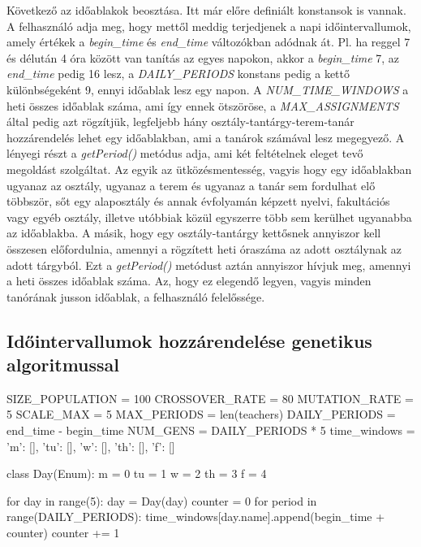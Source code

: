 \documentclass[12pt,a4paper]{report}
\begin{document}
Következő az időablakok beosztása. Itt már előre definiált konstansok is vannak. A felhasználó adja meg, hogy mettől meddig terjedjenek a napi időintervallumok, amely értékek a \textit{begin\_time} és \textit{end\_time} változókban adódnak át. Pl. ha reggel 7 és délután 4 óra között van tanítás az egyes napokon, akkor a \textit{begin\_time} 7, az \textit{end\_time} pedig 16 lesz, a \textit{DAILY\_PERIODS} konstans pedig a kettő különbségeként 9, ennyi időablak lesz egy napon. A \textit{NUM\_TIME\_WINDOWS} a heti összes időablak száma, ami így ennek ötszöröse, a \textit{MAX\_ASSIGNMENTS} által pedig azt rögzítjük, legfeljebb hány osztály-tantárgy-terem-tanár hozzárendelés lehet egy időablakban, ami a tanárok számával lesz megegyező. A lényegi részt a \textit{getPeriod()} metódus adja, ami két feltételnek eleget tevő megoldást szolgáltat. Az egyik az ütközésmentesség, vagyis hogy egy időablakban ugyanaz az osztály, ugyanaz a terem és ugyanaz a tanár sem fordulhat elő többször, sőt egy alaposztály és annak évfolyamán képzett nyelvi, fakultációs vagy egyéb osztály, illetve utóbbiak közül egyszerre több sem kerülhet ugyanabba az időablakba. A másik, hogy egy osztály-tantárgy kettősnek annyiszor kell összesen előfordulnia, amennyi a rögzített heti óraszáma az adott osztálynak az adott tárgyból. Ezt a \textit{getPeriod()} metódust aztán annyiszor hívjuk meg, amennyi a heti összes időablak száma. Az, hogy ez elegendő legyen, vagyis minden tanórának jusson időablak, a felhasználó felelőssége.

\subsection{Időintervallumok hozzárendelése genetikus algoritmussal}

\begin{python}
SIZE_POPULATION = 100
CROSSOVER_RATE = 80
MUTATION_RATE = 5
SCALE_MAX = 5
MAX_PERIODS = len(teachers)
DAILY_PERIODS = end_time - begin_time
NUM_GENS = DAILY_PERIODS * 5
time_windows = {'m': [], 'tu': [], 'w': [], 'th': [], 'f': []}


class Day(Enum):
    m = 0
    tu = 1
    w = 2
    th = 3
    f = 4


for day in range(5):
    day = Day(day)
    counter = 0
    for period in range(DAILY_PERIODS):
        time_windows[day.name].append(begin_time + counter)
        counter += 1
\end{python}
\end{document}
